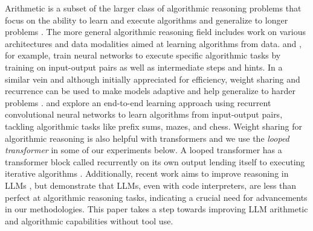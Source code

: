 \documentclass{article}
\begin{document}
Arithmetic is a subset of the larger class of algorithmic reasoning problems that focus on the ability to learn and execute algorithms and generalize to longer problems \citep{anil2022exploring, jelassi2023length, yang2023gpt, velivckovic2022clrs, rodionov2024discrete, alberto2024can}.
The more general algorithmic reasoning field includes work on various architectures and data modalities aimed at learning algorithms from data. \citet{velivckovic2022clrs} and \citet{rodionov2024discrete}, for example,  train neural networks to execute specific algorithmic tasks by training on input-output pairs as well as intermediate steps and hints. 
In a similar vein and although initially appreciated for efficiency, weight sharing and recurrence can be used to make models adaptive and help generalize to harder problems \citep{dehghani2018universal, sukhbaatar-etal-2019-adaptive, Lan2020ALBERT, ibarz2022generalist}.
\citet{schwarzschild2021can} and \citet{bansal2022endtoend} explore an end-to-end learning approach using recurrent convolutional neural networks to learn algorithms from input-output pairs, tackling algorithmic tasks like prefix sums, mazes, and chess. 
Weight sharing for algorithmic reasoning is also helpful with transformers and we use the \emph{looped transformer} in some of our experiments below.
A looped transformer has a transformer block called recurrently on its own output lending itself to executing iterative algorithms
\citep{giannou2023looped, yang2023looped, de2024simulation}.
Additionally, recent work aims to improve reasoning in LLMs \citep{zhou2023algorithms}, but
\citet{mcleish2024benchmarking} demonstrate that LLMs, even with code interpreters, are less than perfect at algorithmic reasoning tasks, indicating a crucial need for advancements in our methodologies. 
This paper takes a step towards improving LLM arithmetic and algorithmic capabilities without tool use.
\end{document}
